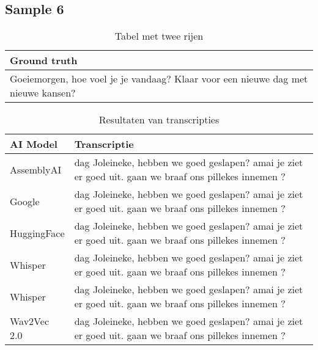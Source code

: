 \subsection{Sample 6}
\begin{table}[htbp]
    \centering
    \label{tab:groundtruth_sample6}
    \begin{tabularx}{\textwidth}{|X|}
        \hline
        \textbf{Ground truth} \\
        
        \hline
        Goeiemorgen, hoe voel je je vandaag? Klaar voor een nieuwe dag met nieuwe kansen? \\
        \hline
    \end{tabularx}
    \caption{Tabel met twee rijen}
\end{table}

\begin{table}[htbp]
    \centering
    \label{tab:results_sample6}
    \begin{tabularx}{\textwidth}{|l|X|}
        \hline
        \textbf{AI Model} & \textbf{Transcriptie} \\ \midrule
        
        AssemblyAI & dag Joleineke, hebben we goed geslapen? amai je ziet er goed uit. gaan we braaf ons pillekes innemen ? \\ \hline
        
        Google & dag Joleineke, hebben we goed geslapen? amai je ziet er goed uit. gaan we braaf ons pillekes innemen ? \\ \hline
        
        HuggingFace & dag Joleineke, hebben we goed geslapen? amai je ziet er goed uit. gaan we braaf ons pillekes innemen ? \\ \hline
        
        Whisper & dag Joleineke, hebben we goed geslapen? amai je ziet er goed uit. gaan we braaf ons pillekes innemen ? \\ \hline
        
        Whisper & dag Joleineke, hebben we goed geslapen? amai je ziet er goed uit. gaan we braaf ons pillekes innemen ? \\ \hline
        
        Wav2Vec 2.0 & dag Joleineke, hebben we goed geslapen? amai je ziet er goed uit. gaan we braaf ons pillekes innemen ? \\ \hline
    \end{tabularx}
    \caption{Resultaten van transcripties}
\end{table}
\FloatBarrier

